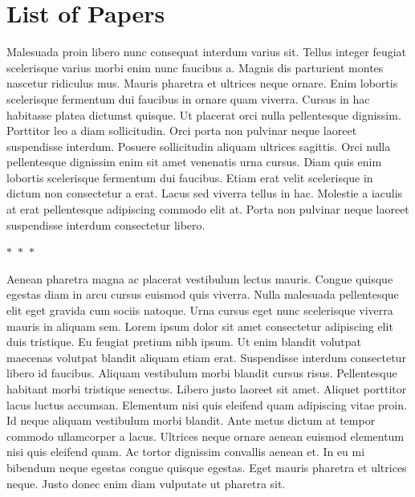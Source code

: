 \documentclass[paper = a4, fontsize = 12pt, numbers = noenddot, DIV = 15, twoside, 
paper = portrait,
listof = totoc,
listof = chapterentry,
egregdoesnotlikesansseriftitles, %
parskip = half %
]{scrbook}
\begin{document}
\printglossaries%

\clearpage

\setcounter{tocdepth}{1} %
\listoffigures
\clearpage
\listoftables
\clearpage
{}
\clearpage

\chapter*{List of Papers}

Malesuada proin libero nunc consequat interdum varius sit. Tellus integer feugiat scelerisque varius morbi enim nunc faucibus a. Magnis dis parturient montes nascetur ridiculus mus. Mauris pharetra et ultrices neque ornare. Enim lobortis scelerisque fermentum dui faucibus in ornare quam viverra. Cursus in hac habitasse platea dictumst quisque. Ut placerat orci nulla pellentesque dignissim. Porttitor leo a diam sollicitudin. Orci porta non pulvinar neque laoreet suspendisse interdum. Posuere sollicitudin aliquam ultrices sagittis. Orci nulla pellentesque dignissim enim sit amet venenatis urna cursus. Diam quis enim lobortis scelerisque fermentum dui faucibus. Etiam erat velit scelerisque in dictum non consectetur a erat. Lacus sed viverra tellus in hac. Molestie a iaculis at erat pellentesque adipiscing commodo elit at. Porta non pulvinar neque laoreet suspendisse interdum consectetur libero.

\begin{center}
	$\ast$~$\ast$~$\ast$
\end{center}

Aenean pharetra magna ac placerat vestibulum lectus mauris. Congue quisque egestas diam in arcu cursus euismod quis viverra. Nulla malesuada pellentesque elit eget gravida cum sociis natoque. Urna cursus eget nunc scelerisque viverra mauris in aliquam sem. Lorem ipsum dolor sit amet consectetur adipiscing elit duis tristique. Eu feugiat pretium nibh ipsum. Ut enim blandit volutpat maecenas volutpat blandit aliquam etiam erat. Suspendisse interdum consectetur libero id faucibus. Aliquam vestibulum morbi blandit cursus risus. Pellentesque habitant morbi tristique senectus. Libero justo laoreet sit amet. Aliquet porttitor lacus luctus accumsan. Elementum nisi quis eleifend quam adipiscing vitae proin. Id neque aliquam vestibulum morbi blandit. Ante metus dictum at tempor commodo ullamcorper a lacus. Ultrices neque ornare aenean euismod elementum nisi quis eleifend quam. Ac tortor dignissim convallis aenean et. In eu mi bibendum neque egestas congue quisque egestas. Eget mauris pharetra et ultrices neque. Justo donec enim diam vulputate ut pharetra sit.
\end{document}
